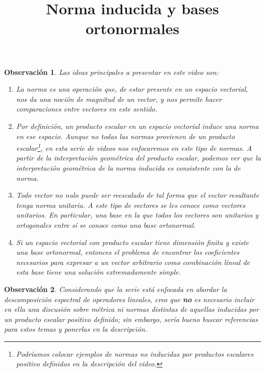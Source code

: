 \documentclass[12pt,dvipsnames]{article}
\newtheorem{obs}{Observación}[section]
\numberwithin{equation}{section}
\begin{document}
\title{Norma inducida y bases ortonormales}
\date{}
\maketitle

\begin{obs}
    Las ideas principales a presentar en este video son:

    \begin{enumerate}[label=(\roman*)]
        \item La norma es una operación que, de estar presente en un espacio vectorial, nos da una noción de \emph{magnitud} de un vector, y nos permite hacer comparaciones entre vectores en este sentido. 

        \item Por definición, un producto escalar en un espacio vectorial induce una norma en ese espacio. Aunque no todas las normas provienen de un producto escalar\footnote{Podríamos colocar ejemplos de normas no inducidas por productos escalares positivo definidos en la descripción del video.}, en esta serie de videos nos enfocaremos en este tipo de normas. A partir de la interpretación geométrica del producto escalar, podemos ver que la interpretación geométrica de la norma inducida es consistente con la de norma.

        \item Todo vector no nulo puede ser reescalado de tal forma que el vector resultante tenga norma unitaria. A este tipo de vectores se les conoce como vectores unitarios. En particular, una base en la que todos los vectores son unitarios y ortogonales entre sí se conoce como una base ortonormal.

        \item Si un espacio vectorial con producto escalar tiene dimensión finita y existe una base ortonormal, entonces el problema de encontrar los coeficientes necesarios para expresar a un vector arbitrario como combinación lineal de esta base tiene una solución extremadamente simple.
    \end{enumerate}
\end{obs}

\begin{obs}
Considerando que la serie está enfocada en abordar la descomposición espectral de operadores lineales, creo que \textbf{no} es necesario incluir en ella una discusión sobre métrica ni normas distintas de aquellas inducidas por un producto escalar positivo definido; sin embargo, sería bueno buscar referencias para estos temas y ponerlas en la descripción.
\end{obs}
\end{document}
